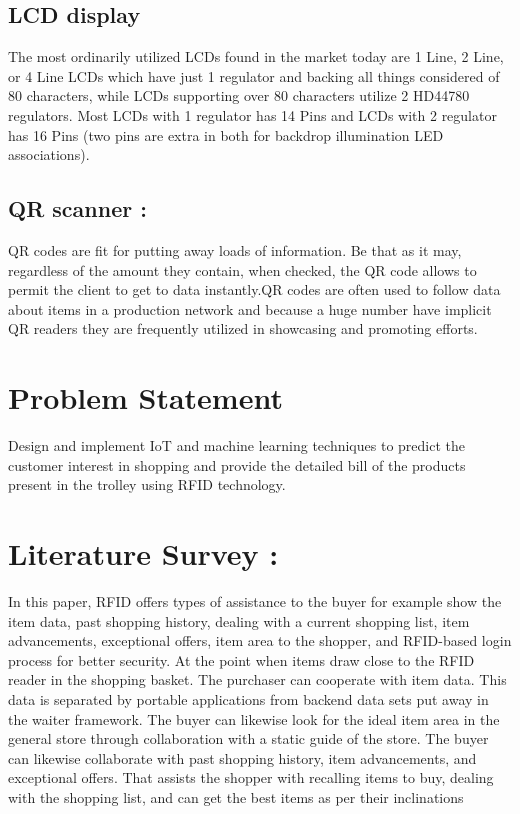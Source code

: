 \documentclass[conference]{IEEEtran}
\begin{document}
\subsection{LCD display}
The most ordinarily utilized LCDs found in the market today are 1 Line, 2 Line, or 4 Line LCDs which have just 1 regulator and backing all things considered of 80 characters, while LCDs supporting over 80 characters utilize 2 HD44780 regulators. Most LCDs with 1 regulator has 14 Pins and LCDs with 2 regulator has 16 Pins (two pins are extra in both for backdrop illumination LED associations)\cite{b2}.

\subsection{QR scanner :}
QR codes are fit for putting away loads of information. Be that as it may, regardless of the amount they contain, when checked, the QR code allows to permit the client to get to data instantly\cite{b2}.QR codes are often used to follow data about items in a production network and because a huge number have implicit QR readers they are frequently utilized in showcasing and promoting efforts.

\section{Problem Statement}
	Design and implement IoT and machine learning techniques to predict the customer interest in shopping and provide the detailed bill of the products present in the trolley using RFID technology. 
	


\section{Literature Survey :}
In this paper\cite{b1}, RFID offers types of assistance to the buyer for example show the item data, past shopping history, dealing with a current shopping list, item advancements, exceptional offers, item area to the shopper, and RFID-based login process for better security. At the point when items draw close to the RFID reader in the shopping basket. The purchaser can cooperate with item data. This data is separated by portable applications from backend data sets put away in the waiter framework. The buyer can likewise look for the ideal item area in the general store through collaboration with a static guide of the store. The buyer can likewise collaborate with past shopping history, item advancements, and exceptional offers. That assists the shopper with recalling items to buy, dealing with the shopping list, and can get the best items as per their inclinations\\
\end{document}
